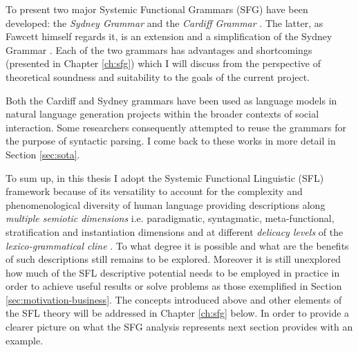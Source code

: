 % 
To present two major Systemic Functional Grammars (SFG) have been developed: the \textit{Sydney Grammar} \citep{Halliday2013} and the \textit{Cardiff Grammar} \citep{Fawcett2008}. The latter, as Fawcett himself regards it, is an extension and a simplification of the Sydney Grammar \citep[xviii]{Fawcett2008}. Each of the two grammars has advantages and shortcomings (presented in Chapter \ref{ch:sfg}) which I will discuss from the perspective of theoretical soundness and suitability to the goals of the current project.

Both the Cardiff and Sydney grammars have been used as language models in natural language generation projects within the broader contexts of social interaction. Some researchers \citep{Kasper1988, ODonoghue1991a, ODonnell1993, Souter1996, Day2007} consequently attempted to reuse the grammars for the purpose of syntactic parsing.
I come back to these works in more detail in Section \ref{sec:sota}.


To sum up, in this thesis I adopt the Systemic Functional Linguistic (SFL) framework because of its versatility to account for the complexity and phenomenological diversity of human language providing descriptions along \textit{multiple semiotic dimensions} i.e. paradigmatic, syntagmatic, meta-functional, stratification and instantiation dimensions \citep{Halliday2003} and at different \textit{delicacy levels} of the \textit{lexico-grammatical cline} \citep{Halliday2002, Hasan2014}. To what degree it is possible and what are the benefits of such descriptions still remains to be explored. Moreover it is still unexplored how much of the SFL descriptive potential needs to be employed in practice in order to achieve useful results or solve problems as those exemplified in Section \ref{sec:motivation-business}. The concepts introduced above and other elements of the SFL theory will be addressed in Chapter \ref{ch:sfg} below. In order to provide a clearer picture on what the SFG analysis represents next section provides with an example.


